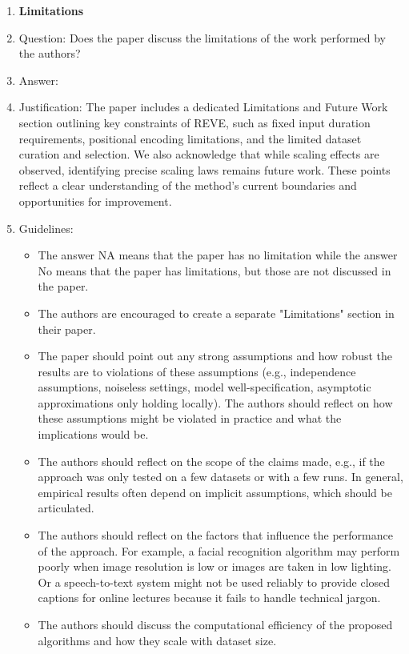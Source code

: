 \documentclass{article}
\begin{document}
\begin{enumerate}
\item {\bf Limitations}
    \item[] Question: Does the paper discuss the limitations of the work performed by the authors?
    \item[] Answer: \answerYes{} %
    \item[] Justification: The paper includes a dedicated Limitations and Future Work section outlining key constraints of REVE, such as fixed input duration requirements, positional encoding limitations, and the limited dataset curation and selection. We also acknowledge that while scaling effects are observed, identifying precise scaling laws remains future work. These points reflect a clear understanding of the method’s current boundaries and opportunities for improvement.
    \item[] Guidelines:
    \begin{itemize}
        \item The answer NA means that the paper has no limitation while the answer No means that the paper has limitations, but those are not discussed in the paper. 
        \item The authors are encouraged to create a separate "Limitations" section in their paper.
        \item The paper should point out any strong assumptions and how robust the results are to violations of these assumptions (e.g., independence assumptions, noiseless settings, model well-specification, asymptotic approximations only holding locally). The authors should reflect on how these assumptions might be violated in practice and what the implications would be.
        \item The authors should reflect on the scope of the claims made, e.g., if the approach was only tested on a few datasets or with a few runs. In general, empirical results often depend on implicit assumptions, which should be articulated.
        \item The authors should reflect on the factors that influence the performance of the approach. For example, a facial recognition algorithm may perform poorly when image resolution is low or images are taken in low lighting. Or a speech-to-text system might not be used reliably to provide closed captions for online lectures because it fails to handle technical jargon.
        \item The authors should discuss the computational efficiency of the proposed algorithms and how they scale with dataset size.

\end{itemize}
\end{enumerate}
\end{document}
